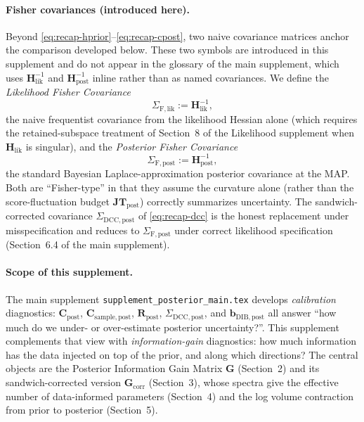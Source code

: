 \documentclass[11pt]{article}
\begin{document}
\paragraph{Fisher covariances (introduced here).}
Beyond \eqref{eq:recap-hprior}--\eqref{eq:recap-cpost}, two naive covariance matrices anchor the comparison developed below. These two symbols are introduced in this supplement and do not appear in the glossary of the main supplement, which uses $\mathbf H_{\mathrm{lik}}^{-1}$ and $\mathbf H_{\mathrm{post}}^{-1}$ inline rather than as named covariances. We define the \emph{Likelihood Fisher Covariance}
\begin{equation}
\Sigma_{\mathrm{F},\mathrm{lik}} := \mathbf H_{\mathrm{lik}}^{-1},
\label{eq:sigma-F-lik}
\end{equation}
the naive frequentist covariance from the likelihood Hessian alone (which requires the retained-subspace treatment of Section~8 of the Likelihood supplement when $\mathbf H_{\mathrm{lik}}$ is singular), and the \emph{Posterior Fisher Covariance}
\begin{equation}
\Sigma_{\mathrm{F},\mathrm{post}} := \mathbf H_{\mathrm{post}}^{-1},
\label{eq:sigma-F-post}
\end{equation}
the standard Bayesian Laplace-approximation posterior covariance at the MAP. Both are ``Fisher-type'' in that they assume the curvature alone (rather than the score-fluctuation budget $\mathbf{JT}_{\mathrm{post}}$) correctly summarizes uncertainty. The sandwich-corrected covariance $\Sigma_{\mathrm{DCC},\mathrm{post}}$ of \eqref{eq:recap-dcc} is the honest replacement under misspecification and reduces to $\Sigma_{\mathrm{F},\mathrm{post}}$ under correct likelihood specification (Section~6.4 of the main supplement).

\paragraph{Scope of this supplement.}
The main supplement \texttt{supplement\_posterior\_main.tex} develops \emph{calibration} diagnostics: $\mathbf C_{\mathrm{post}}$, $\mathbf C_{\mathrm{sample},\mathrm{post}}$, $\mathbf R_{\mathrm{post}}$, $\Sigma_{\mathrm{DCC},\mathrm{post}}$, and $\mathbf b_{\mathrm{DIB},\mathrm{post}}$ all answer ``how much do we under- or over-estimate posterior uncertainty?''. This supplement complements that view with \emph{information-gain} diagnostics: how much information has the data injected on top of the prior, and along which directions? The central objects are the Posterior Information Gain Matrix $\mathbf G$ (Section~2) and its sandwich-corrected version $\mathbf G_{\mathrm{corr}}$ (Section~3), whose spectra give the effective number of data-informed parameters (Section~4) and the log volume contraction from prior to posterior (Section~5).
\end{document}
